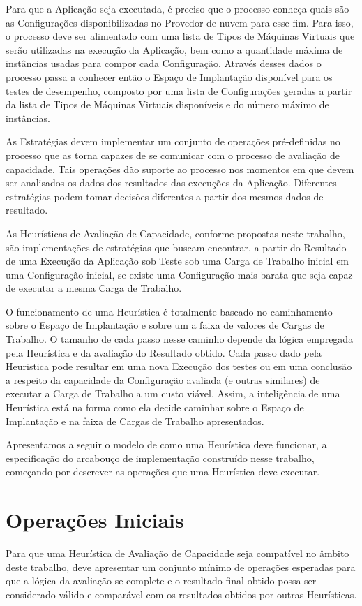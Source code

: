 Para que a Aplicação seja executada, é preciso que o processo conheça quais são
as Configurações disponibilizadas no Provedor de nuvem para esse fim. Para isso,
o processo deve ser alimentado com uma lista de Tipos de Máquinas Virtuais que
serão utilizadas na execução da Aplicação, bem como a quantidade máxima de 
instâncias usadas para compor cada Configuração. Através desses dados o processo
passa a conhecer então o Espaço de Implantação disponível para os testes de 
desempenho, composto por uma lista de Configurações geradas a partir da lista de
 Tipos de Máquinas Virtuais disponíveis e do número máximo de instâncias.

  
As Estratégias devem implementar um conjunto de operações pré-definidas no processo 
que as torna capazes de se comunicar com o processo de avaliação de capacidade. Tais 
operações dão suporte ao processo nos momentos em que devem ser analisados os dados
dos resultados das execuções da Aplicação. Diferentes estratégias podem tomar 
decisões diferentes a partir dos mesmos dados de resultado.

As Heurísticas de Avaliação de Capacidade, conforme propostas neste trabalho, 
são implementações de estratégias que buscam encontrar, a partir do Resultado 
de uma Execução da Aplicação sob Teste sob uma Carga de Trabalho inicial em uma 
Configuração inicial, se existe uma Configuração mais barata que seja capaz de 
executar a mesma Carga de Trabalho.

O funcionamento de uma Heurística é totalmente baseado no caminhamento sobre o
Espaço de Implantação e sobre um a faixa de valores de Cargas de Trabalho. O 
tamanho de cada passo nesse caminho depende da lógica empregada pela Heurística 
e da avaliação do Resultado obtido. Cada passo dado pela Heuristica pode resultar 
em uma nova Execução dos testes ou em uma conclusão a respeito da capacidade da 
Configuração avaliada (e outras similares) de executar a Carga de Trabalho a um 
custo viável. Assim, a inteligência de uma Heurística está na forma como ela 
decide caminhar sobre o Espaço de Implantação e na faixa de Cargas de
Trabalho apresentados.

Apresentamos a seguir o modelo de como uma Heurística deve funcionar, a 
especificação do arcabouço de implementação construído nesse trabalho, começando
por descrever as operações que uma Heurística deve executar. 

\section{Operações Iniciais}
Para que uma Heurística de Avaliação de Capacidade seja compatível no âmbito deste trabalho, 
deve apresentar um conjunto mínimo de operações esperadas para que a lógica da
avaliação se complete e o resultado final obtido possa ser considerado válido e
comparável com os resultados obtidos por outras Heurísticas.


